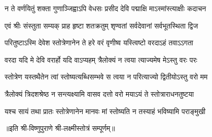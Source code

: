 \twolineshloka
{न ते वर्णयितुं शक्ता गुणाञ्जिह्वाऽपि वेधसः}
{प्रसीद देवि पद्माक्षि माऽस्मांस्त्याक्षीः कदाचन}

\twolineshloka
{एवं श्रीः संस्तुता सम्यक् प्राह हृष्टा शतक्रतुम्}
{शृण्वतां सर्वदेवानां सर्वभूतस्थिता द्विज}

\twolineshloka
{परितुष्टाऽस्मि देवेश स्तोत्रेणानेन ते हरे}
{वरं वृणीष्व यस्त्विष्टो वरदाऽहं तवाऽऽगता}

\twolineshloka
{वरदा यदि मे देवि वरार्हो यदि वाऽप्यहम्}
{त्रैलोक्यं न त्वया त्याज्यमेष मेऽस्तु वरः परः}

\twolineshloka
{स्तोत्रेण यस्तथैतेन त्वां स्तोष्यत्यब्धिसम्भवे}
{स त्वया न परित्याज्यो द्वितीयोऽस्तु वरो मम}

\twolineshloka
{त्रैलोक्यं त्रिदशश्रेष्ठ न सन्त्यक्ष्यामि वासव}
{दत्तो वरो मयाऽयं ते स्तोत्राराधनतुष्टया}

\twolineshloka
{यश्च सायं तथा प्रातः स्तोत्रेणानेन मानवः}
{मां स्तोष्यति न तस्याहं भविष्यामि पराङ्मुखी}

॥इति श्री-विष्णुपुराणे श्री-लक्ष्मीस्तोत्रं सम्पूर्णम्॥
